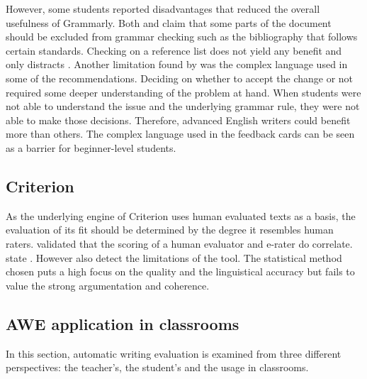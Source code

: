 \documentclass[runningheads]{llncs}
\let\OldTextregistered\textregistered
\renewcommand{\textregistered}{\OldTextregistered\xspace}
\begin{document}
However, some students reported disadvantages that reduced the overall usefulness of Grammarly\textregistered. Both \textcite{ventayen_graduate_2018} and  \textcite{nova_utilizing_2018} claim that some parts of the document should be excluded from grammar checking such as the bibliography that follows certain standards. Checking on a reference list does not yield any benefit and only distracts \citep{ventayen_graduate_2018, nova_utilizing_2018}. Another limitation found by \textcite{cavaleri_you_2016} was the complex language used in some of the recommendations. Deciding on whether to accept the change or not required some deeper understanding of the problem at hand. When students were not able to understand the issue and the underlying grammar rule, they were not able to make those decisions. Therefore, advanced English writers could benefit more than others. The complex language used in the feedback cards can be seen as a barrier for beginner-level students. 

\subsection{Criterion\textregistered}
As the underlying engine of Criterion\textregistered uses human evaluated texts as a basis, the evaluation of its fit should be determined by the degree it resembles human raters. \textcite{weigle_validation_2010} validated that the scoring of a human evaluator and e-rater\textregistered do correlate. \citeauthor{lim_review_2012} state . However \textcite{lim_review_2012} also detect the limitations of the tool. The statistical method chosen puts a high focus on the quality and the linguistical accuracy but fails to value the strong argumentation and coherence. 

\subsection{AWE application in classrooms}
In this section, automatic writing evaluation is examined from three different perspectives: the teacher's, the student's and the usage in classrooms. 
\end{document}
